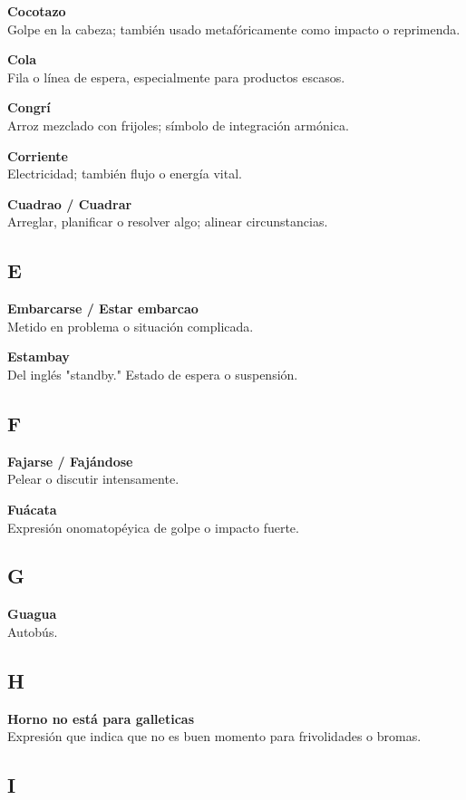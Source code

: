 \documentclass[12pt]{article}
\begin{document}
\textbf{Cocotazo}\\
Golpe en la cabeza; también usado metafóricamente como impacto o reprimenda.

\textbf{Cola}\\
Fila o línea de espera, especialmente para productos escasos.

\textbf{Congrí}\\
Arroz mezclado con frijoles; símbolo de integración armónica.

\textbf{Corriente}\\
Electricidad; también flujo o energía vital.

\textbf{Cuadrao / Cuadrar}\\
Arreglar, planificar o resolver algo; alinear circunstancias.

\subsection*{E}

\textbf{Embarcarse / Estar embarcao}\\
Metido en problema o situación complicada.

\textbf{Estambay}\\
Del inglés "standby." Estado de espera o suspensión.

\subsection*{F}

\textbf{Fajarse / Fajándose}\\
Pelear o discutir intensamente.

\textbf{Fuácata}\\
Expresión onomatopéyica de golpe o impacto fuerte.

\subsection*{G}

\textbf{Guagua}\\
Autobús.

\subsection*{H}

\textbf{Horno no está para galleticas}\\
Expresión que indica que no es buen momento para frivolidades o bromas.

\subsection*{I}
\end{document}
